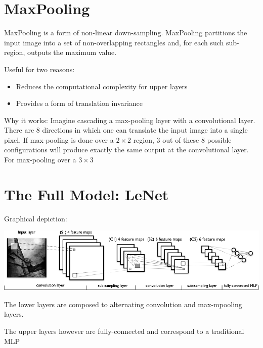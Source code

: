 \section{MaxPooling}
MaxPooling is a form of non-linear down-sampling. MaxPooling partitions
the input image into a set of non-overlapping rectangles and, for each
such sub-region, outputs the maximum value.

Useful for two reasons:
\begin{itemize}
    \item Reduces the computational complexity for upper layers
    \item Provides a form of translation invariance
\end{itemize}

Why it works: Imagine cascading a max-pooling layer with a convolutional
layer. There are $8$ directions in which one can translate the input image
into a single pixel. If max-pooling is done over a $2\times 2$ region, 
$3$ out of these $8$ possible configurations will produce exactly the same
output at the convolutional layer. For max-pooling over a $3\times 3$

\section{The Full Model: LeNet}
Graphical depiction: 

\includegraphics{mylenet}

The lower layers are composed to alternating convolution and max-mpooling
layers.

The upper layers however are fully-connected and correspond to a
traditional MLP

